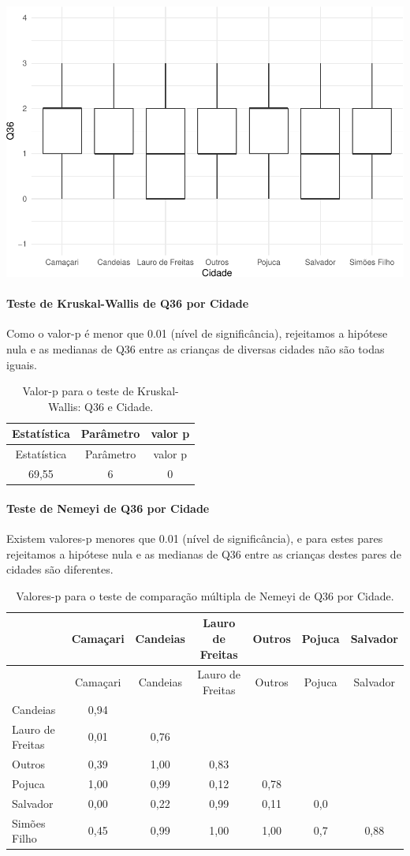 \documentclass[]{article}
\let\oldparagraph\paragraph
\renewcommand{\paragraph}[1]{\oldparagraph{#1}\mbox{}}
\begin{document}
\begin{center}\includegraphics[width=0.75\linewidth]{relatorio_covid19_files/figure-latex/unnamed-chunk-1316-1} \end{center}

\hypertarget{teste-de-kruskal-wallis-de-q36-por-cidade}{%
\paragraph{Teste de Kruskal-Wallis de Q36 por Cidade}\label{teste-de-kruskal-wallis-de-q36-por-cidade}}

Como o valor-p é menor que 0.01 (nível de significância), rejeitamos a hipótese nula e as medianas de Q36 entre as crianças de diversas cidades não são todas iguais.

\begin{longtable}[]{@{}ccc@{}}
\caption{\label{tab:unnamed-chunk-1318}Valor-p para o teste de Kruskal-Wallis: Q36 e Cidade.}\tabularnewline
\toprule
Estatística & Parâmetro & valor p\tabularnewline
\midrule
\endfirsthead
\toprule
Estatística & Parâmetro & valor p\tabularnewline
\midrule
\endhead
69,55 & 6 & 0\tabularnewline
\bottomrule
\end{longtable}

\hypertarget{teste-de-nemeyi-de-q36-por-cidade}{%
\paragraph{Teste de Nemeyi de Q36 por Cidade}\label{teste-de-nemeyi-de-q36-por-cidade}}

Existem valores-p menores que 0.01 (nível de significância), e para estes pares rejeitamos a hipótese nula e as medianas de Q36 entre as crianças destes pares de cidades são diferentes.

\begin{longtable}[]{@{}lcccccc@{}}
\caption{\label{tab:unnamed-chunk-1320}Valores-p para o teste de comparação múltipla de Nemeyi de Q36 por Cidade.}\tabularnewline
\toprule
& Camaçari & Candeias & Lauro de Freitas & Outros & Pojuca & Salvador\tabularnewline
\midrule
\endfirsthead
\toprule
& Camaçari & Candeias & Lauro de Freitas & Outros & Pojuca & Salvador\tabularnewline
\midrule
\endhead
Candeias & 0,94 & & & & &\tabularnewline
Lauro de Freitas & 0,01 & 0,76 & & & &\tabularnewline
Outros & 0,39 & 1,00 & 0,83 & & &\tabularnewline
Pojuca & 1,00 & 0,99 & 0,12 & 0,78 & &\tabularnewline
Salvador & 0,00 & 0,22 & 0,99 & 0,11 & 0,0 &\tabularnewline
Simões Filho & 0,45 & 0,99 & 1,00 & 1,00 & 0,7 & 0,88\tabularnewline
\bottomrule
\end{longtable}
\end{document}
